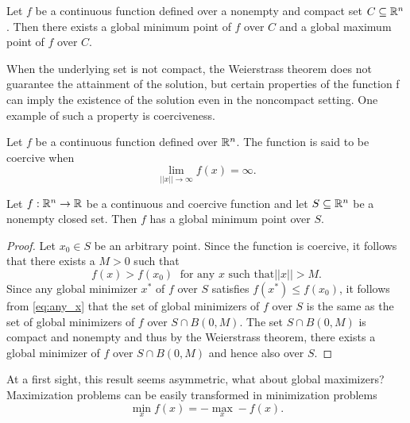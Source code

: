 \documentclass[10pt,a4paper]{article}
\begin{document}
\begin{theorem}[Weierstrass]
	Let $f$ be a continuous function defined over a nonempty and compact set $C \subseteq \mathbb{R}^n$. Then there exists a global minimum point of $f$ over $C$ and a global maximum point of $f$ over $C$.
\end{theorem}
When the underlying set is not compact, the Weierstrass theorem does not guarantee
the attainment of the solution, but certain properties of the function f can imply the existence of the solution even in the noncompact setting. One example of such a property is coerciveness.
\begin{definition}[Coerciveness]
	Let $f$ be a continuous function defined over $\mathbb{R}^n$. The function is said to be coercive when 
	\begin{equation*}
		\lim_{||x||\to \infty} f(x) = \infty.
	\end{equation*}
\end{definition}
\begin{theorem}
	Let $f: \mathbb{R}^n \to \mathbb{R}$ be a continuous and coercive function and let $S \subseteq \mathbb{R}^n$ be a nonempty closed set. Then $f$ has a global minimum point over $S$.
\end{theorem}
\begin{proof}
	Let $x_0\in S$ be an arbitrary point. Since the function is coercive, it follows that there exists a $M>0$ such that
	\begin{equation}\label{eq:any_x}
		f(x)>f(x_0) \; \text{ for any $x$ such that} ||x||>M.
	\end{equation}
Since any global minimizer $x^*$ of $f$ over $S$ satisfies $f(x^*) \leq f(x_0)$, it follows from \eqref{eq:any_x} that  the set of global minimizers of $f$ over $S$ is the same as the set of global minimizers of $f$ over $S\cap B(0,M)$. The set $S\cap B(0,M)$ is compact and nonempty and thus by the Weierstrass theorem, there exists a global minimizer of $f$ over $S\cap B(0,M)$ and hence also over $S$.
\end{proof}
\begin{remark}
	At a first sight, this result seems asymmetric, what about global maximizers? Maximization problems can be easily transformed in minimization problems
	$$\min_x f(x) = -\max_x -f(x).$$
\end{remark}
\begin{example}
	
\end{example}




\end{document}
